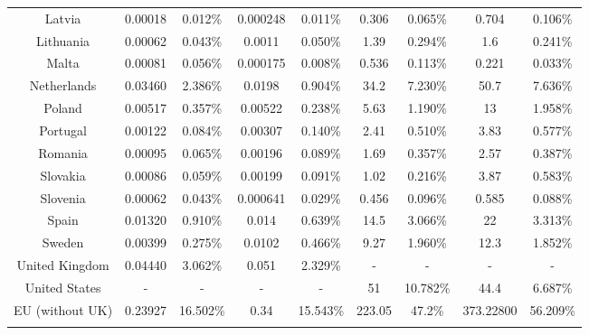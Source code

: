 \documentclass[12pt]{article}
\begin{document}
\begin{table}[!htbp]
{{\begin{tabular}{@{\extracolsep{5pt}} ccccccccc}
Latvia & 0.00018 & 0.012\% & 0.000248 & 0.011\% & 0.306 & 0.065\% & 0.704 & 0.106\% \\ 
Lithuania & 0.00062 & 0.043\% & 0.0011 & 0.050\% & 1.39 & 0.294\% & 1.6 & 0.241\% \\ 
Malta & 0.00081 & 0.056\% & 0.000175 & 0.008\% & 0.536 & 0.113\% & 0.221 & 0.033\% \\ 
Netherlands & 0.03460 & 2.386\% & 0.0198 & 0.904\% & 34.2 & 7.230\% & 50.7 & 7.636\% \\ 
Poland & 0.00517 & 0.357\% & 0.00522 & 0.238\% & 5.63 & 1.190\% & 13 & 1.958\% \\ 
Portugal & 0.00122 & 0.084\% & 0.00307 & 0.140\% & 2.41 & 0.510\% & 3.83 & 0.577\% \\ 
Romania & 0.00095 & 0.065\% & 0.00196 & 0.089\% & 1.69 & 0.357\% & 2.57 & 0.387\% \\ 
Slovakia & 0.00086 & 0.059\% & 0.00199 & 0.091\% & 1.02 & 0.216\% & 3.87 & 0.583\% \\ 
Slovenia & 0.00062 & 0.043\% & 0.000641 & 0.029\% & 0.456 & 0.096\% & 0.585 & 0.088\% \\ 
Spain & 0.01320 & 0.910\% & 0.014 & 0.639\% & 14.5 & 3.066\% & 22 & 3.313\% \\ 
Sweden & 0.00399 & 0.275\% & 0.0102 & 0.466\% & 9.27 & 1.960\% & 12.3 & 1.852\% \\ 
United Kingdom & 0.04440 & 3.062\% & 0.051 & 2.329\% &  -    &  -    &  -    &  -    \\ 
United States &  -    &  -    &  -    &  -    & 51 & 10.782\% & 44.4 & 6.687\% \\ 
EU (without UK) & 0.23927 & 16.502\% &  0.34  & 15.543\% &  223.05  & 47.2\% & 373.22800 & 56.209\% \\ 
\hline \\[-1.8ex] 
\end{tabular} 
}}
\end{table}
\end{document}
